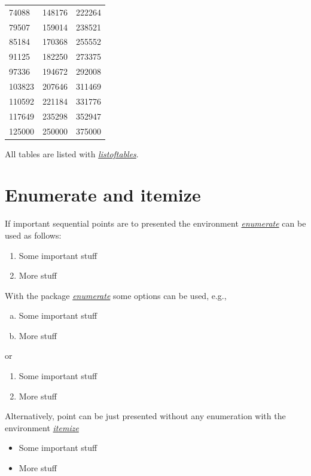 \documentclass[a4paper,11pt,oneside]{book}
\newcommand{\imp}[1]{\underline{\textit{#1}}}
\begin{document}
\begin{center}
\begin{longtable}{l|l|l}
 74088 & 148176 & 222264 \\
 79507 & 159014 & 238521 \\
 85184 & 170368 & 255552 \\
 91125 & 182250 & 273375 \\
 97336 & 194672 & 292008 \\
 103823 & 207646 & 311469 \\
 110592 & 221184 & 331776 \\
 117649 & 235298 & 352947 \\
 125000 & 250000 & 375000 \\
\end{longtable}
\end{center}

All tables are listed with \imp{listoftables}.


\section{Enumerate and itemize}

If important sequential points are to presented the environment \imp{enumerate} can be used as follows:
\begin{enumerate}
\item
	Some important stuff
\item
	More stuff
\end{enumerate}
With the package \imp{enumerate} some options can be used, e.g.,
\begin{enumerate}[a)]
\item
	Some important stuff
\item
	More stuff
\end{enumerate}
or 
\begin{enumerate}[~~~1)]
\item
	Some important stuff
\item
	More stuff
\end{enumerate}

Alternatively, point can be just presented without any enumeration with the environment \imp{itemize}
\begin{itemize}
\item
	Some important stuff
\item
	More stuff
\end{itemize}

\end{document}
